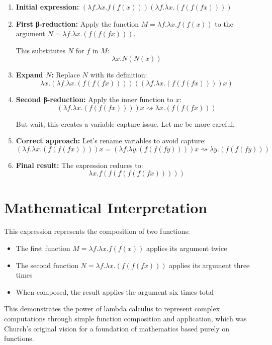 \documentclass[12pt]{article}
\begin{document}
\begin{enumerate}
    \item \textbf{Initial expression:} $(\lambda f.\lambda x.f(f(x))) (\lambda f.\lambda x.(f(f(f x))))$
    
    \item \textbf{First β-reduction:} Apply the function $M = \lambda f.\lambda x.f(f(x))$ to the argument $N = \lambda f.\lambda x.(f(f(f x)))$.
    
    This substitutes $N$ for $f$ in $M$:
    $$\lambda x. N(N(x))$$
    
    \item \textbf{Expand $N$:} Replace $N$ with its definition:
    $$\lambda x. (\lambda f.\lambda x.(f(f(f x)))) ((\lambda f.\lambda x.(f(f(f x)))) x)$$
    
    \item \textbf{Second β-reduction:} Apply the inner function to $x$:
    $$(\lambda f.\lambda x.(f(f(f x)))) x \rightsquigarrow \lambda x.(f(f(f x)))$$
    
    But wait, this creates a variable capture issue. Let me be more careful.
    
    \item \textbf{Correct approach:} Let's rename variables to avoid capture:
    $$(\lambda f.\lambda x.(f(f(f x)))) x = (\lambda f.\lambda y.(f(f(f y)))) x \rightsquigarrow \lambda y.(f(f(f y)))$$
    
    \item \textbf{Final result:} The expression reduces to:
    $$\lambda x. f(f(f(f(f(f x)))))$$
\end{enumerate}

\section{Mathematical Interpretation}

This expression represents the composition of two functions:
\begin{itemize}
    \item The first function $M = \lambda f.\lambda x.f(f(x))$ applies its argument twice
    \item The second function $N = \lambda f.\lambda x.(f(f(f x)))$ applies its argument three times
    \item When composed, the result applies the argument six times total
\end{itemize}

This demonstrates the power of lambda calculus to represent complex computations through simple function composition and application, which was Church's original vision for a foundation of mathematics based purely on functions.
\end{document}
